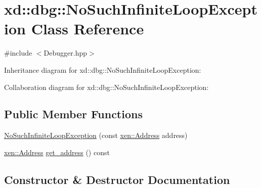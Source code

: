 \hypertarget{classxd_1_1dbg_1_1_no_such_infinite_loop_exception}{}\section{xd\+:\+:dbg\+:\+:No\+Such\+Infinite\+Loop\+Exception Class Reference}
\label{classxd_1_1dbg_1_1_no_such_infinite_loop_exception}


{\ttfamily \#include $<$Debugger.\+hpp$>$}



Inheritance diagram for xd\+:\+:dbg\+:\+:No\+Such\+Infinite\+Loop\+Exception\+:


Collaboration diagram for xd\+:\+:dbg\+:\+:No\+Such\+Infinite\+Loop\+Exception\+:
\subsection*{Public Member Functions}
\begin{DoxyCompactItemize}
\item 
\mbox{\hyperlink{classxd_1_1dbg_1_1_no_such_infinite_loop_exception_abf6837f7dbb14abf69fbc3c59cfc89f9}{No\+Such\+Infinite\+Loop\+Exception}} (const \mbox{\hyperlink{namespacexd_1_1xen_a94a8d6c9448e8330c771c100dba152c3}{xen\+::\+Address}} address)
\item 
\mbox{\hyperlink{namespacexd_1_1xen_a94a8d6c9448e8330c771c100dba152c3}{xen\+::\+Address}} \mbox{\hyperlink{classxd_1_1dbg_1_1_no_such_infinite_loop_exception_a83b0d3f3fec215a59b8ecc9e70996505}{get\+\_\+address}} () const
\end{DoxyCompactItemize}


\subsection{Constructor \& Destructor Documentation}
\mbox{\label{classxd_1_1dbg_1_1_no_such_infinite_loop_exception_abf6837f7dbb14abf69fbc3c59cfc89f9}} 
